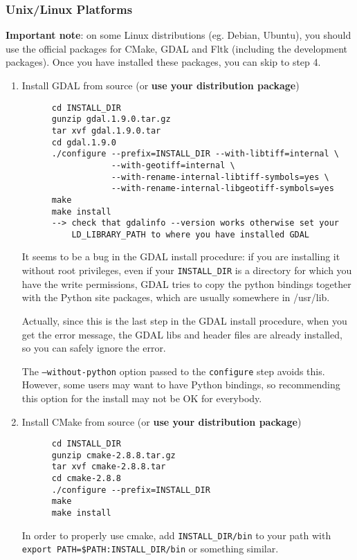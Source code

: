 \subsubsection{Unix/Linux Platforms}

\textbf{Important note}: on some Linux distributions (eg. Debian, Ubuntu), you should use
the official packages for CMake, GDAL and Fltk (including the development packages). Once you have installed these
packages, you can skip to step 4.

\begin{enumerate}

\item Install GDAL from source (or \textbf{use your distribution package})
  \begin{verbatim}
      cd INSTALL_DIR
      gunzip gdal.1.9.0.tar.gz
      tar xvf gdal.1.9.0.tar
      cd gdal.1.9.0
      ./configure --prefix=INSTALL_DIR --with-libtiff=internal \
                  --with-geotiff=internal \
                  --with-rename-internal-libtiff-symbols=yes \
                  --with-rename-internal-libgeotiff-symbols=yes
      make
      make install
      --> check that gdalinfo --version works otherwise set your
          LD_LIBRARY_PATH to where you have installed GDAL
  \end{verbatim}

It seems to be a bug in the GDAL install procedure: if you are installing it without root privileges, even if your \texttt{INSTALL\_DIR} is a directory for which you have the write permissions, GDAL tries to copy the python bindings together with the Python site packages, which are usually somewhere in /usr/lib.

Actually, since this is the last step in the GDAL install procedure, when you get the error message, the GDAL libs and header files are already installed, so you can safely ignore the error.

The \texttt{--without-python} option passed to the \texttt{configure} step avoids this. However, some users may want to have Python bindings, so recommending this option for the install may not be OK for everybody.

\item Install CMake from source (or \textbf{use your distribution package})
  \begin{verbatim}
      cd INSTALL_DIR
      gunzip cmake-2.8.8.tar.gz
      tar xvf cmake-2.8.8.tar
      cd cmake-2.8.8
      ./configure --prefix=INSTALL_DIR
      make
      make install
  \end{verbatim}
      In order to properly use cmake, add \texttt{INSTALL\_DIR/bin} to
      your path with \texttt{export PATH=\$PATH:INSTALL\_DIR/bin} or
      something similar.


\end{enumerate}
